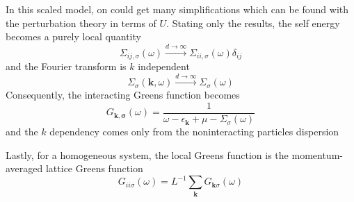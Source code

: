 \documentclass[a4paper]{article}
\begin{document}
In this scaled model, on could get many simplifications which can be found with
the perturbation theory in terms of $U$. Stating only the results, the self
energy becomes a purely local quantity
\begin{equation}
    \Sigma_{ij,\sigma}(\omega) \xrightarrow{d \to \infty}
        \Sigma_{ii,\sigma}(\omega) \delta_{ij}
\end{equation}
and the Fourier transform is $k$ independent
\begin{equation}
    \Sigma_{\sigma}(\mathbf{k}, \omega) \xrightarrow{d \to \infty}
        \Sigma_{\sigma}(\omega)
\end{equation}
Consequently, the interacting Greens function becomes
\begin{equation}
    G_{\mathbf{k,\sigma}}(\omega) =
        \frac{1}{\omega - \epsilon_{\mathbf{k}} + \mu - \Sigma_{\sigma}(\omega)}
\end{equation}
and the $k$ dependency comes only from the noninteracting particles dispersion

Lastly, for a homogeneous system, the local Greens function is the
momentum-averaged lattice Greens function
\begin{equation}
    G_{ii\sigma}(\omega) = L^{-1}\sum_{\mathbf{k}} G_{\mathbf{k}\sigma}(\omega)
\end{equation}
\end{document}
